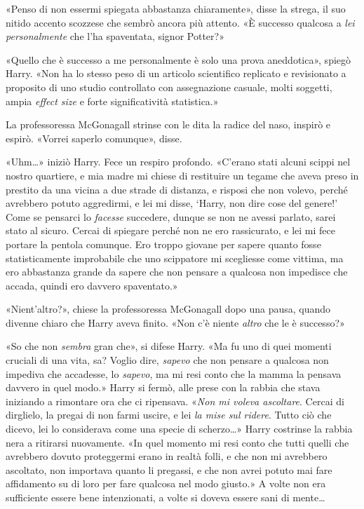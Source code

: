 «Penso di non essermi spiegata abbastanza chiaramente», disse la strega, il suo nitido accento scozzese che sembrò ancora più attento. «È successo qualcosa a \textit{lei personalmente} che l’ha spaventata, signor Potter?»

«Quello che è successo a me personalmente è solo una prova aneddotica», spiegò Harry. «Non ha lo stesso peso di un articolo scientifico replicato e revisionato a proposito di uno studio controllato con assegnazione casuale, molti soggetti, ampia \textit{effect size} e forte significatività statistica.»

La professoressa McGonagall strinse con le dita la radice del naso, inspirò e espirò. «Vorrei saperlo comunque», disse.

«Uhm…» iniziò Harry. Fece un respiro profondo. «C’erano stati alcuni scippi nel nostro quartiere, e mia madre mi chiese di restituire un tegame che aveva preso in prestito da una vicina a due strade di distanza, e risposi che non volevo, perché avrebbero potuto aggredirmi, e lei mi disse, ‘Harry, non dire cose del genere!’ Come se pensarci lo \textit{facesse} succedere, dunque se non ne avessi parlato, sarei stato al sicuro. Cercai di spiegare perché non ne ero rassicurato, e lei mi fece portare la pentola comunque. Ero troppo giovane per sapere quanto fosse statisticamente improbabile che uno scippatore mi scegliesse come vittima, ma ero abbastanza grande da sapere che non pensare a qualcosa non impedisce che accada, quindi ero davvero spaventato.»

«Nient’altro?», chiese la professoressa McGonagall dopo una pausa, quando divenne chiaro che Harry aveva finito. «Non c’è niente \textit{altro} che le è successo?»

«So che non \textit{sembra} gran che», si difese Harry. «Ma fu uno di quei momenti cruciali di una vita, sa? Voglio dire, \textit{sapevo} che non pensare a qualcosa non impediva che accadesse, lo \textit{sapevo}, ma mi resi conto che la mamma la pensava davvero in quel modo.» Harry si fermò, alle prese con la rabbia che stava iniziando a rimontare ora che ci ripensava. «\textit{Non mi voleva ascoltare}. Cercai di dirglielo, la pregai di non farmi uscire, e lei \textit{la mise sul ridere}. Tutto ciò che dicevo, lei lo considerava come una specie di scherzo…» Harry costrinse la rabbia nera a ritirarsi nuovamente. «In quel momento mi resi conto che tutti quelli che avrebbero dovuto proteggermi erano in realtà folli, e che non mi avrebbero ascoltato, non importava quanto li pregassi, e che non avrei potuto mai fare affidamento su di loro per fare qualcosa nel modo giusto.» A volte non era sufficiente essere bene intenzionati, a volte si doveva essere sani di mente…

